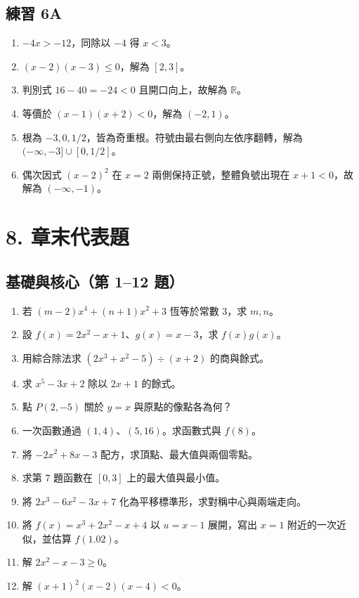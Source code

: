 \documentclass[11pt,a4paper]{article}
\providecommand{\tightlist}{%
  \setlength{\itemsep}{0pt}\setlength{\parskip}{0pt}}
\begin{document}
\subsection{練習 6A}\label{ux7df4ux7fd2-6a-1}

\begin{enumerate}
\def\labelenumi{\arabic{enumi}.}
\tightlist
\item
  \(-4x>-12\)，同除以 \(-4\) 得 \(\boxed{x<3}\)。
\item
  \((x-2)(x-3)\le0\)，解為 \(\boxed{[2,3]}\)。
\item
  判別式 \(16-40=-24<0\) 且開口向上，故解為 \(\boxed{\mathbb R}\)。
\item
  等價於 \((x-1)(x+2)<0\)，解為 \(\boxed{(-2,1)}\)。
\item
  根為 \(-3,0,1/2\)，皆為奇重根。符號由最右側向左依序翻轉，解為 \(\boxed{(-\infty,-3]\cup[0,1/2]}\)。
\item
  偶次因式 \((x-2)^2\) 在 \(x=2\) 兩側保持正號，整體負號出現在 \(x+1<0\)，故解為 \(\boxed{(-\infty,-1)}\)。
\end{enumerate}

\section{8. 章末代表題}\label{ux7ae0ux672bux4ee3ux8868ux984c}

\subsection{基礎與核心（第 1--12 題）}\label{ux57faux790eux8207ux6838ux5fc3ux7b2c-112-ux984c}

\begin{enumerate}
\def\labelenumi{\arabic{enumi}.}
\tightlist
\item
  若 \((m-2)x^4+(n+1)x^2+3\) 恆等於常數 \(3\)，求 \(m,n\)。
\item
  設 \(f(x)=2x^2-x+1\)、\(g(x)=x-3\)，求 \(f(x)g(x)\)。
\item
  用綜合除法求 \((2x^3+x^2-5)\div(x+2)\) 的商與餘式。
\item
  求 \(x^5-3x+2\) 除以 \(2x+1\) 的餘式。
\item
  點 \(P(2,-5)\) 關於 \(y=x\) 與原點的像點各為何？
\item
  一次函數通過 \((1,4)\)、\((5,16)\)。求函數式與 \(f(8)\)。
\item
  將 \(-2x^2+8x-3\) 配方，求頂點、最大值與兩個零點。
\item
  求第 7 題函數在 \([0,3]\) 上的最大值與最小值。
\item
  將 \(2x^3-6x^2-3x+7\) 化為平移標準形，求對稱中心與兩端走向。
\item
  將 \(f(x)=x^3+2x^2-x+4\) 以 \(u=x-1\) 展開，寫出 \(x=1\) 附近的一次近似，並估算 \(f(1.02)\)。
\item
  解 \(2x^2-x-3\ge0\)。
\item
  解 \((x+1)^2(x-2)(x-4)<0\)。
\end{enumerate}
\end{document}
